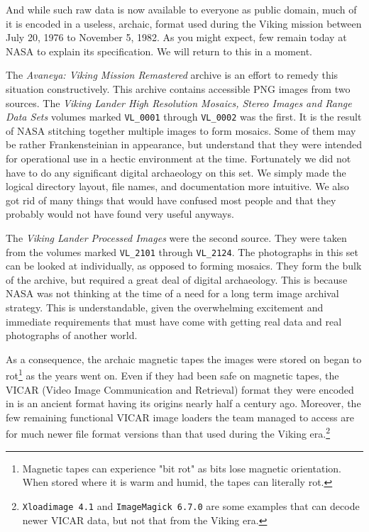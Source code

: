 And while such raw data is now available to everyone as public domain, much of it is encoded in a useless, archaic, format used during the Viking mission between July 20, 1976 to November 5, 1982. As you might expect, few remain today at NASA to explain its specification. We will return to this in a moment.

The {\it Avaneya: Viking Mission Remastered} archive is an effort to remedy this situation constructively. This archive contains accessible PNG images from two sources. The {\it Viking Lander High Resolution Mosaics, Stereo Images and Range Data Sets} volumes marked {\tt VL_0001} through {\tt VL_0002} was the first. It is the result of NASA stitching together multiple images to form mosaics. Some of them may be rather Frankensteinian in appearance, but understand that they were intended for operational use in a hectic environment at the time. Fortunately we did not have to do any significant digital archaeology on this set. We simply made the logical directory layout, file names, and documentation more intuitive. We also got rid of many things that would have confused most people and that they probably would not have found very useful anyways.

The {\it Viking Lander Processed Images} were the second source. They were taken from the volumes marked {\tt VL_2101} through {\tt VL_2124}. The photographs in this set can be looked at individually, as opposed to forming mosaics. They form the bulk of the archive, but required a great deal of digital archaeology. This is because NASA was not thinking at the time of a need for a long term image archival strategy. This is understandable, given the overwhelming excitement and immediate requirements that must have come with getting real data and real photographs of another world.

    {}

As a consequence, the archaic magnetic tapes the images were stored on began to rot\footnote{Magnetic tapes can experience "bit rot" as bits lose magnetic orientation. When stored where it is warm and humid, the tapes can literally rot.} as the years went on. Even if they had been safe on magnetic tapes, the VICAR (Video Image Communication and Retrieval) format they were encoded in is an ancient format having its origins nearly half a century ago. Moreover, the few remaining functional VICAR image loaders the team managed to access are for much newer file format versions than that used during the Viking era.\footnote{{\tt Xloadimage 4.1} and {\tt ImageMagick 6.7.0} are some examples that can decode newer VICAR data, but not that from the Viking era.}

